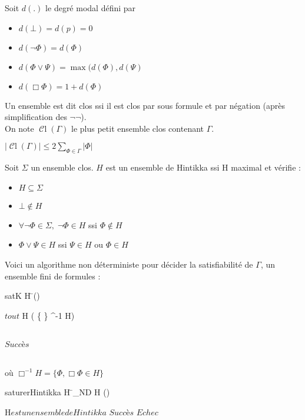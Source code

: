 \documentclass[10pt,a4paper]{article}
\DeclareMathOperator{\Cl}{\mathscr{C}l}
\begin{document}
\begin{definition}
 Soit $d(.)$ le degré modal défini par 
\begin{itemize}
 \item $d( \bot) = d( p) = 0$
 \item $ d( \lnot \Phi) = d( \Phi)$
 \item $ d( \Phi \vee \Psi) = \max( d( \Phi), d( \Psi)$
 \item $ d( \Box \Phi) = 1 + d( \Phi)$
\end{itemize}

\end{definition}

\begin{definition}
 Un ensemble est dit clos ssi il est clos par sous formule et par négation (après simplification des $\lnot \lnot$).\\
On note $\Cl(\Gamma)$ le plus petit ensemble clos contenant $ \Gamma$.
\end{definition}

\begin{prop}
 $\displaystyle  | \Cl(\Gamma) | \leq 2 \sum_{\Phi \in \Gamma}  |  \Phi  | $  
\end{prop}

\begin{definition}
Soit $\Sigma$ un ensemble clos. $H$ est un ensemble de Hintikka ssi H maximal et vérifie :
\begin{itemize}
 \item $H \subseteq \Sigma$
 \item $\bot \not \in H$
 \item $\forall \lnot \Phi \in \Sigma, \; \lnot \Phi \in H$ ssi $\Phi \not \in H$
 \item $\Phi \vee \Psi \in H$ ssi $\Psi \in H$ ou $\Phi \in H$
\end{itemize}

\end{definition}

Voici un algorithme non déterministe pour décider la satisfiabilité de $\Gamma$, un ensemble fini de formules  :

\begin{algorithm}{satK}{\Gamma}
 H \= (\Gamma)\\
    \begin{FOR}{$tout $ \lnot \Box \Phi \in H}
	 ( \{ \lnot \Phi \} \cup \Box^{-1} H)
    \end{FOR}\\
    \RETURN $Succès$
\end{algorithm}\\
où $\Box^{-1} H = \{ \Phi, \Box \Phi \in H\}$\\
\begin{algorithm}{saturerHintikka}{\Gamma}
  H \= _{ND} \;\Gamma \subseteq H \subseteq \Cl(\Gamma)\\
  \begin{IF}{H$ est un ensemble de Hintikka$}
      $Succès$
  \ELSE
      $Echec$
\end{IF}
\end{algorithm}
\end{document}
